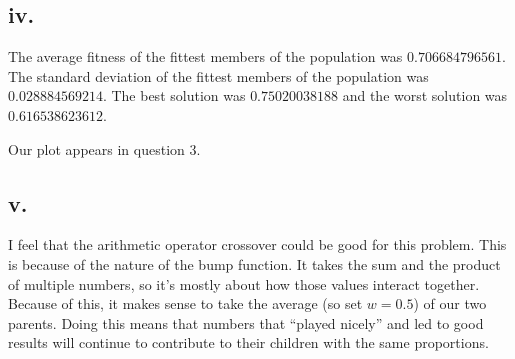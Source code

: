 \documentclass[12pt]{article}
\begin{document}
\subsection{iv.}
The average fitness of the fittest members of the population was $0.706684796561$.  The standard deviation of the fittest members of the population was $0.028884569214$.  The best solution was $0.75020038188$ and the worst solution was $0.616538623612$.

Our plot appears in question 3.

\subsection{v.}
I feel that the arithmetic operator crossover could be good for this problem.  This is because of the nature of the bump function.  It takes the sum and the product of multiple numbers, so it's mostly about how those values interact together.  Because of this, it makes sense to take the average (so set $w=0.5$) of our two parents.  Doing this means that numbers that ``played nicely'' and led to good results will continue to contribute to their children with the same proportions.
\end{document}
